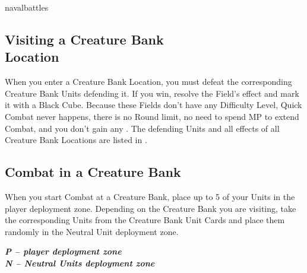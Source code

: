 \begin{expansion}[before=\vspace*{-11mm}]{navalbattles}
\begin{multicols*}{2}
  \subsection*{Visiting a Creature Bank\\Location}
  When you enter a Creature Bank Location, you must defeat the corresponding Creature Bank Units defending it.
  If you win, resolve the Field's effect and mark it with a Black Cube.
  Because these Fields don't have any Difficulty Level, Quick Combat never happens, there is no Round limit, no need to spend MP to extend Combat, and you don't gain any .
  The defending Units and all effects of all Creature Bank Locations are listed in .

  \subsection*{Combat in a Creature Bank}
  When you start Combat at a Creature Bank, place up to 5 of your Units in the player deployment zone.
  Depending on the Creature Bank you are visiting, take the corresponding Units from the Creature Bank Unit Cards and place them randomly in the Neutral Unit deployment zone.

    \bigskip
    \begin{center}
    \end{center}
    \textbf{\footnotesize\textit{\textcolor{darkcandyapplered}{P -- player deployment zone}}}\\
    \textbf{\footnotesize\textit{\textcolor{darkcandyapplered}{N -- Neutral Units deployment zone}}}\\
    \bigskip


\end{multicols*}
\end{expansion}
